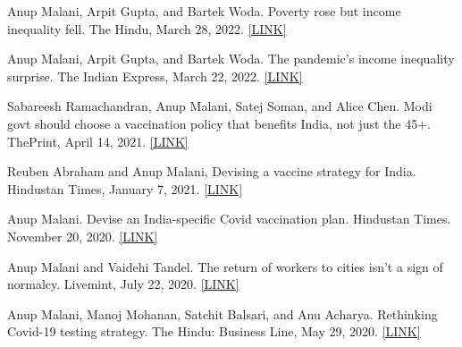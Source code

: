 \documentclass[11pt,letterpaper]{report}
\begin{document}
    \begin{tablist}

        \item[2022] \tab{}Anup Malani, Arpit Gupta, and Bartek Woda. Poverty rose but income inequality fell.  The Hindu, March 28, 2022.  \href{https://www.thehindu.com/opinion/op-ed/poverty-rose-but-income-inequality-fell/article65265220.ece/amp/}{[LINK]}
        
        \item[2022] \tab{}Anup Malani, Arpit Gupta, and Bartek Woda. The pandemic’s income inequality surprise.  The Indian Express, March 22, 2022. \href{https://indianexpress.com/article/opinion/columns/the-pandemics-income-inequality-surprise-covid-lockdown-poverty-economy-7830354/}{[LINK]} 
        
        \item[2021] \tab{}Sabareesh Ramachandran, Anup Malani, Satej Soman, and Alice Chen.  Modi govt should choose a vaccination policy that benefits India, not just the 45+.  ThePrint, April 14, 2021.  \href{https://theprint.in/opinion/modi-govt-should-choose-a-vaccination-policy-that-benefits-india-not-just-the-45/639600/}{[LINK]}
        
        \item[2021] \tab{}Reuben Abraham and Anup Malani, Devising a vaccine strategy for India.  Hindustan Times, January 7, 2021.  \href{https://www.hindustantimes.com/analysis/devising-a-vaccine-strategy-for-india/story-u12s0fA8oFOmfMxXo3St1H.html}{[LINK]}
        
        \item[2020] \tab{}Anup Malani.  Devise an India-specific Covid vaccination plan.  Hindustan Times.  November 20, 2020. \href{https://www.hindustantimes.com/analysis/devise-an-india-specific-covid-vaccination-plan/story-oVRwD2lv1XifvHO7OUQcqM.html}{[LINK]}
        
        \item[2020] \tab{}Anup Malani and Vaidehi Tandel.  The return of workers to cities isn’t a sign of normalcy.  Livemint, July 22, 2020.  \href{https://www.livemint.com/opinion/online-views/the-return-of-workers-to-cities-isn-t-a-sign-of-normalcy-11595426630227.html}{[LINK]}
        
        \item[2020] \tab{}Anup Malani, Manoj Mohanan, Satchit Balsari, and Anu Acharya.  Rethinking Covid-19 testing strategy.  The Hindu: Business Line, May 29, 2020.  \href{https://www.thehindubusinessline.com/opinion/rethinking-covid-19-testing-strategy/article31697253.ece}{[LINK]}
        

\end{tablist}
\end{document}
